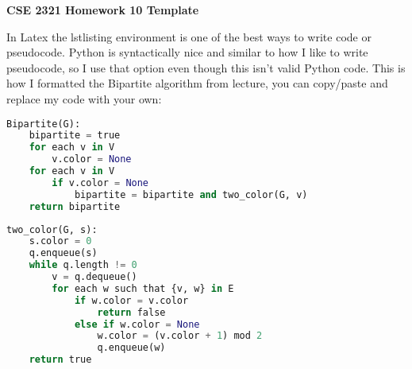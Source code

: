 \documentclass[14pt]{extarticle}
\begin{document}
\textbf{CSE 2321 Homework 10 Template}

In Latex the lstlisting environment is one of the best ways to write code or pseudocode. Python is syntactically nice and similar to how I like to write pseudocode, so I use that option even though this isn't valid Python code. This is how I formatted the Bipartite algorithm from lecture, you can copy/paste and replace my code with your own:

\begin{lstlisting}[language=Python]
Bipartite(G):
	bipartite = true
	for each v in V
		v.color = None
	for each v in V
		if v.color = None
			bipartite = bipartite and two_color(G, v)
	return bipartite
\end{lstlisting}

\begin{lstlisting}[language=Python]
two_color(G, s):
	s.color = 0
	q.enqueue(s)
	while q.length != 0
		v = q.dequeue()
		for each w such that {v, w} in E
			if w.color = v.color
				return false
			else if w.color = None
				w.color = (v.color + 1) mod 2
				q.enqueue(w)
	return true
\end{lstlisting}
\end{document}
